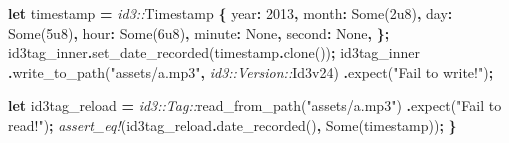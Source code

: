 \documentclass[
]{book}
\newenvironment{Shaded}{\begin{snugshade}}{\end{snugshade}}
\newcommand{\ConstantTok}[1]{\textcolor[rgb]{0.00,0.00,0.00}{#1}}
\newcommand{\DecValTok}[1]{\textcolor[rgb]{0.00,0.00,0.81}{#1}}
\newcommand{\KeywordTok}[1]{\textcolor[rgb]{0.13,0.29,0.53}{\textbf{#1}}}
\newcommand{\NormalTok}[1]{#1}
\newcommand{\OperatorTok}[1]{\textcolor[rgb]{0.81,0.36,0.00}{\textbf{#1}}}
\newcommand{\PreprocessorTok}[1]{\textcolor[rgb]{0.56,0.35,0.01}{\textit{#1}}}
\newcommand{\StringTok}[1]{\textcolor[rgb]{0.31,0.60,0.02}{#1}}
\begin{document}
\begin{Shaded}
\begin{Highlighting}[]
    \KeywordTok{let}\NormalTok{ timestamp }\OperatorTok{=} \PreprocessorTok{id3::}\NormalTok{Timestamp }\OperatorTok{\{}
\NormalTok{        year}\OperatorTok{:} \DecValTok{2013}\OperatorTok{,}
\NormalTok{        month}\OperatorTok{:} \ConstantTok{Some}\NormalTok{(}\DecValTok{2u8}\NormalTok{)}\OperatorTok{,}
\NormalTok{        day}\OperatorTok{:} \ConstantTok{Some}\NormalTok{(}\DecValTok{5u8}\NormalTok{)}\OperatorTok{,}
\NormalTok{        hour}\OperatorTok{:} \ConstantTok{Some}\NormalTok{(}\DecValTok{6u8}\NormalTok{)}\OperatorTok{,}
\NormalTok{        minute}\OperatorTok{:} \ConstantTok{None}\OperatorTok{,}
\NormalTok{        second}\OperatorTok{:} \ConstantTok{None}\OperatorTok{,}
    \OperatorTok{\};}
\NormalTok{    id3tag\_inner}\OperatorTok{.}\NormalTok{set\_date\_recorded(timestamp}\OperatorTok{.}\NormalTok{clone())}\OperatorTok{;}
\NormalTok{    id3tag\_inner}
        \OperatorTok{.}\NormalTok{write\_to\_path(}\StringTok{"assets/a.mp3"}\OperatorTok{,} \PreprocessorTok{id3::Version::}\NormalTok{Id3v24)}
        \OperatorTok{.}\NormalTok{expect(}\StringTok{"Fail to write!"}\NormalTok{)}\OperatorTok{;}

    \KeywordTok{let}\NormalTok{ id3tag\_reload }\OperatorTok{=} \PreprocessorTok{id3::Tag::}\NormalTok{read\_from\_path(}\StringTok{"assets/a.mp3"}\NormalTok{)}
        \OperatorTok{.}\NormalTok{expect(}\StringTok{"Fail to read!"}\NormalTok{)}\OperatorTok{;}
    \PreprocessorTok{assert\_eq!}\NormalTok{(id3tag\_reload}\OperatorTok{.}\NormalTok{date\_recorded()}\OperatorTok{,} \ConstantTok{Some}\NormalTok{(timestamp))}\OperatorTok{;}
\OperatorTok{\}}
\end{Highlighting}
\end{Shaded}


  
\end{document}
